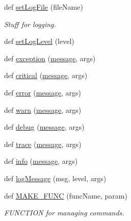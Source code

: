 \begin{DoxyCompactItemize}
\item 
def \hyperlink{class_python_01_g_u_i_1_1appjar_1_1gui_a9a03098331c21ee87210a3382754d35b}{set\+Log\+File} (file\+Name)
\begin{DoxyCompactList}\small\item\em Stuff for logging. \end{DoxyCompactList}\item 
def \hyperlink{class_python_01_g_u_i_1_1appjar_1_1gui_a10d4a1980e353cddaf9bc4143929a5fd}{set\+Log\+Level} (level)
\item 
def \hyperlink{class_python_01_g_u_i_1_1appjar_1_1gui_a3ebce57fe91b6a89c40aa445d14b7421}{exception} (\hyperlink{class_python_01_g_u_i_1_1appjar_1_1gui_a272e00ba02f4665ddbcc731f83191afd}{message}, args)
\item 
def \hyperlink{class_python_01_g_u_i_1_1appjar_1_1gui_a0a55aa1047f6ddf5745e80d7daa298e2}{critical} (\hyperlink{class_python_01_g_u_i_1_1appjar_1_1gui_a272e00ba02f4665ddbcc731f83191afd}{message}, args)
\item 
def \hyperlink{class_python_01_g_u_i_1_1appjar_1_1gui_af22f729601dae6a052666888083813af}{error} (\hyperlink{class_python_01_g_u_i_1_1appjar_1_1gui_a272e00ba02f4665ddbcc731f83191afd}{message}, args)
\item 
def \hyperlink{class_python_01_g_u_i_1_1appjar_1_1gui_aa0a271b0b17a802e6d7b598c12bcd930}{warn} (\hyperlink{class_python_01_g_u_i_1_1appjar_1_1gui_a272e00ba02f4665ddbcc731f83191afd}{message}, args)
\item 
def \hyperlink{class_python_01_g_u_i_1_1appjar_1_1gui_ad40bff6844abe0bd7011d9598cedcb62}{debug} (\hyperlink{class_python_01_g_u_i_1_1appjar_1_1gui_a272e00ba02f4665ddbcc731f83191afd}{message}, args)
\item 
def \hyperlink{class_python_01_g_u_i_1_1appjar_1_1gui_a3e03bea05351523162ba28f136f1523c}{trace} (\hyperlink{class_python_01_g_u_i_1_1appjar_1_1gui_a272e00ba02f4665ddbcc731f83191afd}{message}, args)
\item 
def \hyperlink{class_python_01_g_u_i_1_1appjar_1_1gui_a71dda91e53aec8d7b4ffe6d37f0dc129}{info} (\hyperlink{class_python_01_g_u_i_1_1appjar_1_1gui_a272e00ba02f4665ddbcc731f83191afd}{message}, args)
\item 
def \hyperlink{class_python_01_g_u_i_1_1appjar_1_1gui_a80c2bac3103b9ebf3269cf9b66408b7f}{log\+Message} (msg, level, args)
\item 
def \hyperlink{class_python_01_g_u_i_1_1appjar_1_1gui_a1d2c0d0a475441a8f9208204ef3227a6}{M\+A\+K\+E\+\_\+\+F\+U\+NC} (func\+Name, param)
\begin{DoxyCompactList}\small\item\em F\+U\+N\+C\+T\+I\+ON for managing commands. \end{DoxyCompactList}\item 

\end{DoxyCompactItemize}
